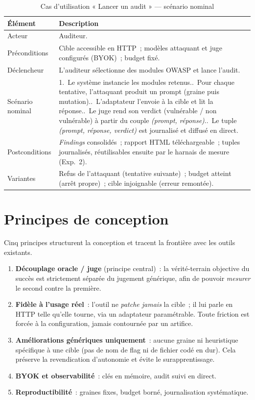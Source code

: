 \begin{table}[H]
\centering
\caption{Cas d'utilisation « Lancer un audit » --- scénario nominal}
\label{tab:uc-audit}
\begin{tabularx}{\textwidth}{l X}
\toprule
\textbf{Élément} & \textbf{Description} \\
\midrule
Acteur & Auditeur. \\
Préconditions & Cible accessible en HTTP~; modèles attaquant et juge configurés (BYOK)~; budget fixé. \\
Déclencheur & L'auditeur sélectionne des modules OWASP et lance l'audit. \\
Scénario nominal & 1.~Le système instancie les modules retenus.\newline 2.~Pour chaque tentative, l'attaquant produit un prompt (graine puis mutation).\newline 3.~L'adaptateur l'envoie à la cible et lit la réponse.\newline 4.~Le juge rend son verdict (vulnérable / non vulnérable) à partir du couple \emph{(prompt, réponse)}.\newline 5.~Le tuple \emph{(prompt, réponse, verdict)} est journalisé et diffusé en direct. \\
Postconditions & \emph{Findings} consolidés~; rapport HTML téléchargeable~; tuples journalisés, réutilisables ensuite par le harnais de mesure (Exp.~2). \\
Variantes & Refus de l'attaquant (tentative suivante)~; budget atteint (arrêt propre)~; cible injoignable (erreur remontée). \\
\bottomrule
\end{tabularx}
\end{table}

\section{Principes de conception}

Cinq principes structurent la conception et tracent la frontière avec les outils existants.

\begin{enumerate}
  \item \textbf{Découplage oracle / juge} (principe central)~: la vérité-terrain objective du succès est strictement séparée du jugement générique, afin de pouvoir \emph{mesurer} le second contre la première.
  \item \textbf{Fidèle à l'usage réel}~: l'outil ne \emph{patche jamais} la cible~; il lui parle en HTTP telle qu'elle tourne, via un adaptateur paramétrable. Toute friction est forcée à la configuration, jamais contournée par un artifice.
  \item \textbf{Améliorations génériques uniquement}~: aucune graine ni heuristique spécifique à une cible (pas de nom de flag ni de fichier codé en dur). Cela préserve la revendication d'autonomie et évite le surapprentissage.
  \item \textbf{BYOK et observabilité}~: clés en mémoire, audit suivi en direct.
  \item \textbf{Reproductibilité}~: graines fixes, budget borné, journalisation systématique.
\end{enumerate}


